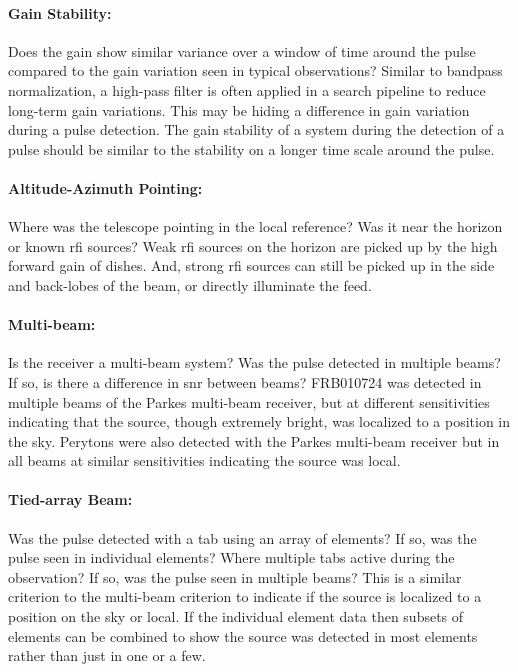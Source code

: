 \documentclass[a4paper,fleqn,usenatbib]{mnras}
\begin{document}
\paragraph{Gain Stability:}

Does the gain show similar variance over a window of time around the pulse
compared to the gain variation seen in typical observations? Similar to bandpass
normalization, a high-pass filter is often applied in a search pipeline to
reduce long-term gain variations. This may be hiding a difference in gain
variation during a pulse detection. The gain stability of a system during the
detection of a pulse should be similar to the stability on a longer time scale
around the pulse.

\paragraph{Altitude-Azimuth Pointing:}

Where was the telescope pointing in the local reference? Was it near the horizon
or known \gls{rfi} sources? Weak \gls{rfi} sources on the horizon are picked up
by the high forward gain of dishes. And, strong \gls{rfi} sources can still be
picked up in the side and back-lobes of the beam, or directly illuminate the
feed.

\paragraph{Multi-beam:}

Is the receiver a multi-beam system? Was the pulse detected in multiple beams?
If so, is there a difference in \gls{snr} between beams? FRB010724 was detected
in multiple beams of the Parkes multi-beam receiver, but at different
sensitivities indicating that the source, though extremely bright, was localized
to a position in the sky. Perytons were also detected with the Parkes multi-beam
receiver but in all beams at similar sensitivities indicating the source was
local.

\paragraph{Tied-array Beam:}

Was the pulse detected with a \gls{tab} using an array of elements? If so, was
the pulse seen in individual elements? Where multiple \glspl{tab} active during
the observation? If so, was the pulse seen in multiple beams? This is a similar
criterion to the multi-beam criterion to indicate if the source is localized to
a position on the sky or local. If the individual element data then subsets of
elements can be combined to show the source was detected in most elements rather
than just in one or a few.
\end{document}
